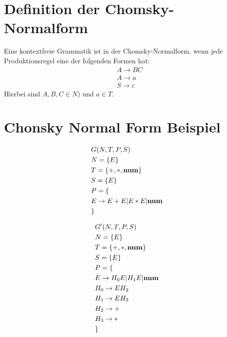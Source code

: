 \documentclass[t]{beamer}
\begin{document}
	\section{Definition der Chomsky-Normalform}\label{sec:chomsky-normal-form-definition}
	\begin{frame}
		Eine kontextfreie Grammatik ist in der Chomsky-Normalform, wenn jede Produktionsregel eine der folgenden Formen hat:
		\begin{align*}
			& A \rightarrow BC \\
			& A \rightarrow a \\
			& S \rightarrow \varepsilon
		\end{align*}
		Hierbei sind $A,B,C \in N$) und $a \in T$.
	\end{frame}


	\section{Chonsky Normal Form Beispiel}\label{sec:chonsky-normal-form-beispiel}
	\begin{frame}
		\begin{minipage}[c]{0.5\textwidth}
			\begin{align*}
				& G(N,T,P,S) \\
				& N= \{E\} \\
				& T= \{+, *, \bold{num}\} \\
				& S= \{E\}  \\
				& P = \{ \\
				& E \rightarrow E + E | E * E | \bold{num} \\
				& \}
			\end{align*}
		\end{minipage}%
		\begin{minipage}[c]{0.5\textwidth}%
			\begin{align*}
				& G'(N,T,P,S) \\
				& N= \{E\} \\
				& T= \{+, *, \bold{num}\} \\
				& S= \{E\}  \\
				& P = \{ \\
				& E \rightarrow H_0 E | H_1 E | \bold{num} \\
				& H_0 \rightarrow E H_2 \\
				& H_1 \rightarrow E H_3 \\
				& H_2 \rightarrow + \\
				& H_3 \rightarrow * \\
				& \}
			\end{align*}
		\end{minipage}
	\end{frame}
\end{document}

